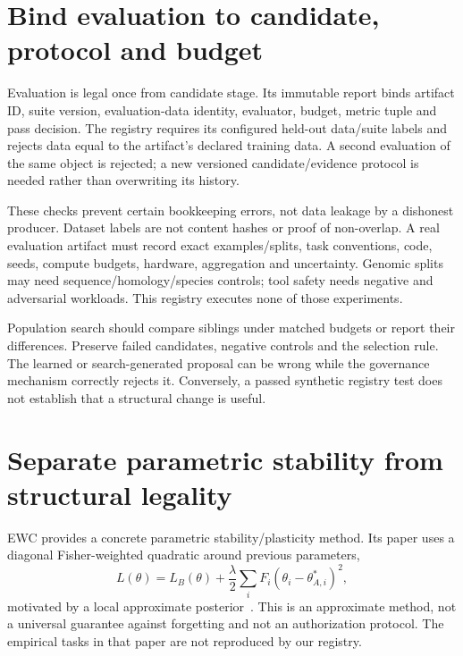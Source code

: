 \section{Bind evaluation to candidate, protocol and budget}
\label{evod43:evaluation}
Evaluation is legal once from candidate stage. Its immutable report binds
artifact ID, suite version, evaluation-data identity, evaluator, budget,
metric tuple and pass decision. The registry requires its configured held-out
data/suite labels and rejects data equal to the artifact's declared training
data. A second evaluation of the same object is rejected; a new versioned
candidate/evidence protocol is needed rather than overwriting its history.

These checks prevent certain bookkeeping errors, not data leakage by a dishonest
producer. Dataset labels are not content hashes or proof of non-overlap.
A real evaluation artifact must record exact examples/splits, task conventions,
code, seeds, compute budgets, hardware, aggregation and uncertainty. Genomic
splits may need sequence/homology/species controls; tool safety needs negative
and adversarial workloads. This registry executes none of those experiments.

Population search should compare siblings under matched budgets or report
their differences. Preserve failed candidates, negative controls and the
selection rule. The learned or search-generated proposal can be wrong while
the governance mechanism correctly rejects it. Conversely, a passed synthetic
registry test does not establish that a structural change is useful.

\section{Separate parametric stability from structural legality}
\label{evod43:ewc}
EWC provides a concrete parametric stability/plasticity method. Its paper
uses a diagonal Fisher-weighted quadratic around previous parameters,
\[
 L(\theta)=L_B(\theta)+\frac\lambda2
       \sum_i F_i(\theta_i-\theta^*_{A,i})^2,
\]
motivated by a local approximate posterior~\cite{evod43:ewc}.
This is an approximate method, not a universal guarantee against forgetting
and not an authorization protocol. The empirical tasks in that paper are not
reproduced by our registry.


